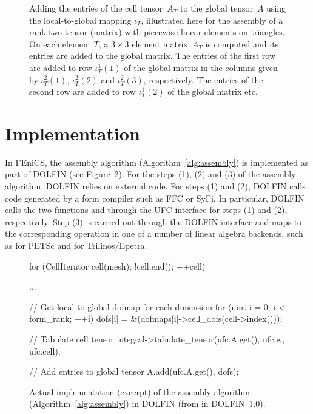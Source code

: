 \begin{figure}
  \center
  \caption{Adding the entries of the cell tensor~$A_T$ to the global
    tensor~$A$ using the local-to-global mapping $\iota_T$,
    illustrated here for the assembly of a rank two tensor (matrix)
    with piecewise linear elements on triangles. On each element
    $T$, a $3 \times 3$ element matrix~$A_T$ is computed and its
    entries are added to the global matrix. The entries of the first
    row are added to row $\iota^1_T(1)$ of the global matrix in the
    columns given by $\iota^2_T(1)$, $\iota^2_T(2)$ and
    $\iota^2_T(3)$, respectively. The entries of the second row are
    added to row $\iota^1_T(2)$ of the global matrix etc.}
  \label{fig:insertion}
\end{figure}

\section{Implementation}

In FEniCS, the assembly algorithm (Algorithm~\ref{alg:assembly}) is
implemented as part of DOLFIN (see
Figure~\ref{fig:assembly,code}). For the steps (1), (2) and (3) of the
assembly algorithm, DOLFIN relies on external code. For steps (1) and
(2), DOLFIN calls code generated by a form compiler such as FFC or
SyFi. In particular, DOLFIN calls the two functions
 and  through the UFC
interface for steps (1) and (2), respectively. Step (3) is carried out
through the DOLFIN  interface and maps to the
corresponding operation in one of a number of linear algebra backends,
such as  for PETSc and 
for Trilinos/Epetra.

\begin{figure}
  \begin{c++}
for (CellIterator cell(mesh); !cell.end(); ++cell)
{
  ...

  // Get local-to-global dofmap for each dimension
  for (uint i = 0; i < form_rank; ++i)
    dofs[i] = &(dofmaps[i]->cell_dofs(cell->index()));

  // Tabulate cell tensor
  integral->tabulate_tensor(ufc.A.get(),
                            ufc.w,
                            ufc.cell);

  // Add entries to global tensor
  A.add(ufc.A.get(), dofs);
}
\end{c++}
  \caption{Actual implementation (excerpt) of the assembly algorithm
    (Algorithm~\ref{alg:assembly}) in DOLFIN (from 
    in DOLFIN~1.0).}
  \label{fig:assembly,code}
\end{figure}

